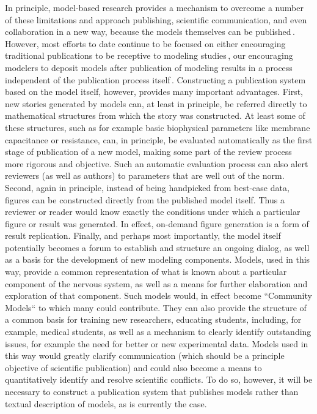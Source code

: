 \documentclass[12pt]{article}
\begin{document}
In principle, model-based research provides a mechanism to overcome a number of these limitations and approach publishing, scientific communication, and even collaboration in a new way, because the models themselves can be published\,\cite{Nickerson:2009uq}.  However, most efforts to date continue to be focused on either encouraging traditional publications to be receptive to modeling studies\,\cite{Wolkenhauer:2009kx}, our encouraging modelers to deposit models after publication of modeling results in a process independent of the publication process itself\,\cite{Hines:2004cr}.  Constructing a publication system based on the model itself, however, provides many important advantages.  First, new stories generated by models can, at least in principle, be referred directly to mathematical structures from which the story was constructed.  At least some of these structures, such as for example basic biophysical parameters like membrane capacitance or resistance, can, in principle, be evaluated automatically as the first stage of publication of a new model, making some part of the review process more rigorous and objective.  Such an automatic evaluation process can also alert reviewers (as well as authors) to parameters that are well out of the norm.  Second, again in principle, instead of being handpicked from best-case data, figures can be constructed directly from the published model itself.  Thus a reviewer or reader would know exactly the conditions under which a particular figure or result was generated.  In effect, on-demand  figure generation is a form of result replication.  Finally, and perhaps most importantly, the model itself potentially becomes a forum to establish and structure an ongoing dialog, as well as a basis for the development of new modeling components. Models, used in this way, provide a common representation of what is known about a particular component of the nervous system, as well as a means for further elaboration and exploration of that component.  Such models would, in effect become ``Community Models`` to which many could contribute.  They can also provide the structure of a common basis for training new researchers, educating students, including, for example, medical students, as well as a mechanism to clearly identify outstanding issues, for example the need for better or new experimental data. Models used in this way would greatly clarify communication (which should be a principle objective of scientific publication) and could also become a means to quantitatively identify and resolve scientific conflicts.  To do so, however, it will be necessary to construct a publication system that publishes models rather than textual description of models, as is currently the case.
\end{document}
